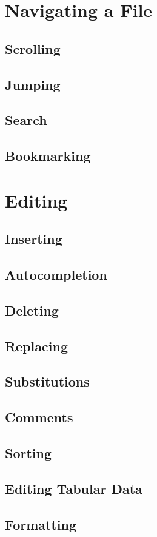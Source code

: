 \documentclass[12pt, oneside]{book}
\begin{document}
\section{Navigating a File}
  \subsection{Scrolling}
  \subsection{Jumping}
  \subsection{Search}
  \subsection{Bookmarking}
\section{Editing}
  \subsection{Inserting}
  \subsection{Autocompletion}
  \subsection{Deleting}
  \subsection{Replacing}
  \subsection{Substitutions}
  \subsection{Comments}
  \subsection{Sorting}
  \subsection{Editing Tabular Data}
  \subsection{Formatting}
\end{document}

